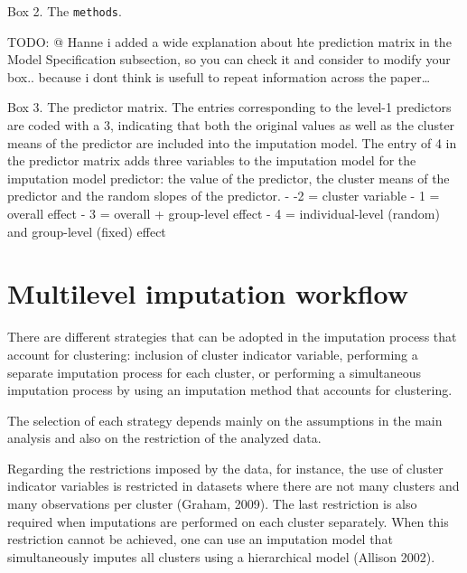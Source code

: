\documentclass[
  article]{jss}
\begin{document}
\begin{tcolorbox}[enhanced jigsaw, arc=.35mm, leftrule=.75mm, toprule=.15mm, colframe=quarto-callout-color-frame, rightrule=.15mm, bottomrule=.15mm, colback=white, breakable, opacityback=0, left=2mm]

Box 2. The \texttt{methods}.

\end{tcolorbox}

\begin{tcolorbox}[enhanced jigsaw, arc=.35mm, leftrule=.75mm, toprule=.15mm, colframe=quarto-callout-color-frame, rightrule=.15mm, bottomrule=.15mm, colback=white, breakable, opacityback=0, left=2mm]

TODO: @ Hanne i added a wide explanation about hte prediction matrix in
the Model Specification subsection, so you can check it and consider to
modify your box.. because i dont think is usefull to repeat information
across the paper\ldots{}

Box 3. The predictor matrix. The entries corresponding to the level-1
predictors are coded with a 3, indicating that both the original values
as well as the cluster means of the predictor are included into the
imputation model. The entry of 4 in the predictor matrix adds three
variables to the imputation model for the imputation model predictor:
the value of the predictor, the cluster means of the predictor and the
random slopes of the predictor. - -2 = cluster variable - 1 = overall
effect - 3 = overall + group-level effect - 4 = individual-level
(random) and group-level (fixed) effect

\end{tcolorbox}

\hypertarget{sec-workflow}{%
\section{Multilevel imputation workflow}\label{sec-workflow}}

There are different strategies that can be adopted in the imputation
process that account for clustering: inclusion of cluster indicator
variable, performing a separate imputation process for each cluster, or
performing a simultaneous imputation process by using an imputation
method that accounts for clustering.\cite{zotero-516}

The selection of each strategy depends mainly on the assumptions in the
main analysis and also on the restriction of the analyzed data.

Regarding the restrictions imposed by the data, for instance, the use of
cluster indicator variables is restricted in datasets where there are
not many clusters and many observations per cluster (Graham, 2009). The
last restriction is also required when imputations are performed on each
cluster separately. When this restriction cannot be achieved, one can
use an imputation model that simultaneously imputes all clusters using a
hierarchical model (Allison 2002).
\end{document}
